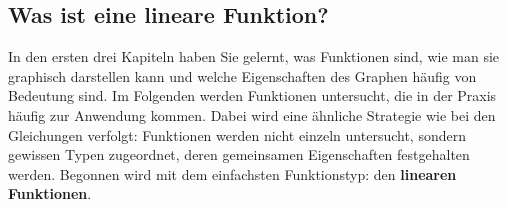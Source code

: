 














\clearpage
\subsection{Was ist eine lineare Funktion?}
In den ersten drei Kapiteln haben Sie gelernt, was Funktionen sind,
wie man sie graphisch darstellen kann und welche Eigenschaften des
Graphen häufig von Bedeutung sind. Im Folgenden werden Funktionen
untersucht, die in der Praxis häufig zur Anwendung kommen.
Dabei wird eine ähnliche Strategie wie bei den Gleichungen verfolgt:
Funktionen werden nicht einzeln untersucht, sondern gewissen Typen
zugeordnet, deren gemeinsamen Eigenschaften festgehalten werden.
Begonnen wird mit dem einfachsten Funktionstyp:
den \textbf{linearen Funktionen}.

